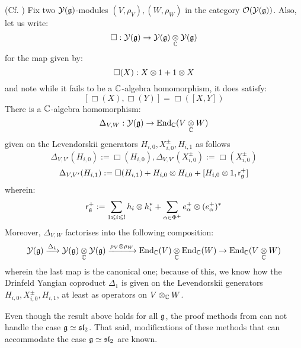         \begin{proposition} \label{prop: yangian_hopf_structure_via_levendorskii_presentation}
            (Cf. \cite[Definition 4.6, Theorem 4.9, and Proposition 5.18]{guay_nakajima_wendlandt_affine_yangian_coproduct}) Fix two $\mathcal{Y}(\mathfrak{g})$-modules $(V, \rho_V), (W, \rho_W)$ in the category $\mathcal{O}(\mathcal{Y}(\mathfrak{g}))$. Also, let us write:
                $$\Box: \calY(\g) \to \calY(\g) \tensor_{\bbC} \calY(\g)$$
            for the map given by:
                $$\Box(X): X \tensor 1 + 1 \tensor X$$
            and note while it fails to be a $\mathbb{C}$-algebra homomorphism, it does satisfy:
                $$[ \Box(X), \Box(Y) ] = \Box( [X, Y] )$$
            There is a $\mathbb{C}$-algebra homomorphism:
                $$\Delta_{V, W}: \calY(\g) \to \End_{\bbC}(V \tensor_{\bbC} W)$$
            given on the Levendorskii generators $H_{i, 0}, X_{i, 0}^{\pm}, H_{i, 1}$ as follows
                $$\Delta_{V, V'}(H_{i, 0}) := \Box(H_{i, 0}), \Delta_{V, V'}(X_{i, 0}^{\pm}) := \Box(X_{i, 0}^{\pm})$$
                $$\Delta_{V, V'}(H_{i, 1}) := \Box(H_{i, 1}) + H_{i, 0} \tensor H_{i, 0} + [H_{i, 0} \tensor 1, \sfr_{\g}^+]$$
            wherein:
                $$\sfr_{\g}^+ := \sum_{1 \leq i \leq l} h_i \tensor h_i^* + \sum_{\alpha \in \Phi^+} e_{\alpha}^+ \tensor ( e_{\alpha}^+ )^*$$
            Moreover, $\Delta_{V, W}$ factorises into the following composition:
                $$\calY(\g) \xrightarrow[]{\Delta_1} \calY(\g) \tensor_{\bbC} \calY(\g) \xrightarrow[]{\rho_V \tensor \rho_W} \End_{\bbC}(V) \tensor_{\bbC} \End_{\bbC}(W) \to \End_{\bbC}(V \tensor_{\bbC} W)$$
            wherein the last map is the canonical one; because of this, we know how the Drinfeld Yangian coproduct $\Delta_1$ is given on the Levendorskii generators $H_{i, 0}, X_{i, 0}^{\pm}, H_{i, 1}$, at least as operators on $V \tensor_{\bbC} W$. 
        \end{proposition}
        \begin{remark}
            Even though the result above holds for all $\mathfrak{g}$, the proof methods from \cite[Theorem 4.9]{guay_nakajima_wendlandt_affine_yangian_coproduct} can not handle the case $\mathfrak{g} \simeq \mathfrak{sl}_2$. That said, modifications of these methods that can accommodate the case $\mathfrak{g} \simeq \mathfrak{sl}_2$ are known. 
        \end{remark}

